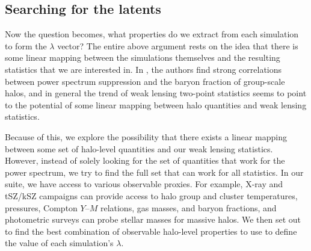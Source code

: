 \documentclass[linenumbers,trackchanges, twocolumn]{aastex701}
\begin{document}
\subsection{Searching for the latents}\label{sec:latent_search}
Now the question becomes, what properties do we extract from each simulation to form the $\lambda$ vector? The entire above argument rests on the idea that there is some linear mapping between the simulations themselves and the resulting statistics that we are interested in. In \citet{vanDaalen2020}, the authors find strong correlations between power spectrum suppression and the baryon fraction of group-scale halos, and in general the trend of weak lensing two-point statistics seems to point to the potential of some linear mapping between halo quantities and weak lensing statistics.

Because of this, we explore the possibility that there exists a linear mapping between some set of halo-level quantities and our weak lensing statistics. However, instead of solely looking for the set of quantities that work for the power spectrum, we try to find the full set that can work for all statistics. In our suite, we have access to various observable proxies. For example, X-ray and tSZ/kSZ campaigns can provide access to halo group and cluster temperatures, pressures, Compton $Y$--$M$ relations, gas masses, and baryon fractions, and photometric surveys can probe stellar masses for massive halos. We then set out to find the best combination of observable halo-level properties to use to define the value of each simulation's $\lambda$.
\end{document}
